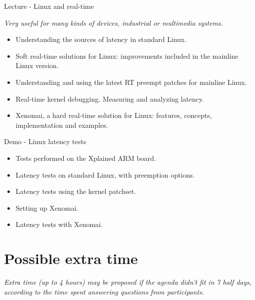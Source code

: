 \documentclass[a4paper,12pt,obeyspaces,spaces,hyphens]{article}
\begin{document}
\newpage

\feagendatwocolumn
{Lecture - Linux and real-time}
{
  {\em Very useful for many kinds of devices, industrial or multimedia systems.}
  \begin{itemize}
  \item Understanding the sources of latency in standard Linux.
  \item Soft real-time solutions for Linux: improvements included
        in the mainline Linux version.
  \item Understanding and using the latest RT preempt patches for
        mainline Linux.
  \item Real-time kernel debugging. Measuring and analyzing latency.
  \item Xenomai, a hard real-time solution for Linux: features, concepts,
        implementation and examples.
  \end{itemize}
}
{Demo - Linux latency tests}
{
  \begin{itemize}
  \item Tests performed on the Xplained ARM board.
  \item Latency tests on standard Linux, with preemption options.
  \item Latency tests using the  kernel patchset.
  \item Setting up Xenomai.
  \item Latency tests with Xenomai.
  \end{itemize}
}

\section{Possible extra time}

{\em Extra time (up to 4 hours) may be proposed if the agenda didn't fit in 7 half days,
     according to the time spent answering questions from participants.}
\end{document}
